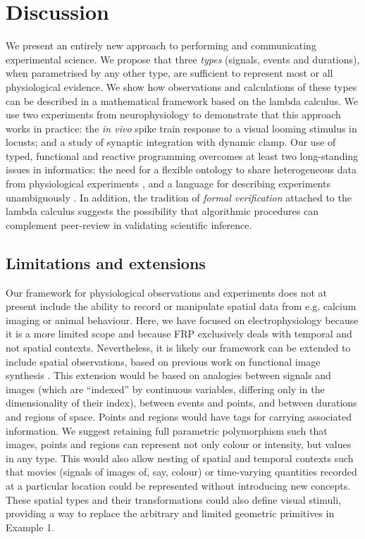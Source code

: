 \section*{Discussion}

We present an entirely new approach to performing and communicating
experimental science. We propose that three \emph{types} (signals, events and
durations), when parametrised by any other type, are sufficient to
represent most or all physiological evidence. We show how observations
and calculations of these types can be described in a mathematical
framework based on the lambda calculus. We use two experiments from
neurophysiology to demonstrate that this approach works in practice:
the \emph{in vivo} spike train response to a visual looming stimulus
in locusts; and a study of synaptic integration with dynamic
clamp. Our use of typed, functional and reactive programming overcomes
at least two long-standing issues in informatics: the need for a
flexible ontology to share heterogeneous data from physiological
experiments \citep{Amari2002}, and a language for describing
experiments unambiguously \citep{Murray-Rust2002}. In addition, the
tradition of \emph{formal verification} attached to the lambda
calculus suggests the possibility that algorithmic procedures can
complement peer-review in validating scientific inference.

\subsection*{Limitations and extensions}

Our framework for physiological observations and experiments does not
at present include the ability to record or manipulate spatial
data from e.g. calcium imaging or animal behaviour. Here, we have
focused on electrophysiology because it is a more limited scope and
because FRP exclusively deals with temporal and not spatial
contexts. Nevertheless, it is likely our framework can be extended to
include spatial observations, based on previous work on functional
image synthesis \citep{Elliott2003}. This extension would be based on
analogies between signals and images (which are ``indexed'' by
continuous variables, differing only in the dimensionality of their
index), between events and points, and between durations and regions
of space. Points and regions would have tags for carrying associated
information. We suggest retaining full parametric polymorphism such
that images, points and regions can represent not only colour or
intensity, but values in any type. This would also allow nesting of
spatial and temporal contexts such that movies (signals of images of,
say, colour) or time-varying quantities recorded at a particular
location \citep[for instance spot calcium measurements as points of
signals of concentration;][]{DiGregorio1999} could be represented
without introducing new concepts. These spatial types and their
transformations could also define visual stimuli, providing a way to
replace the arbitrary and limited geometric primitives in Example 1.

